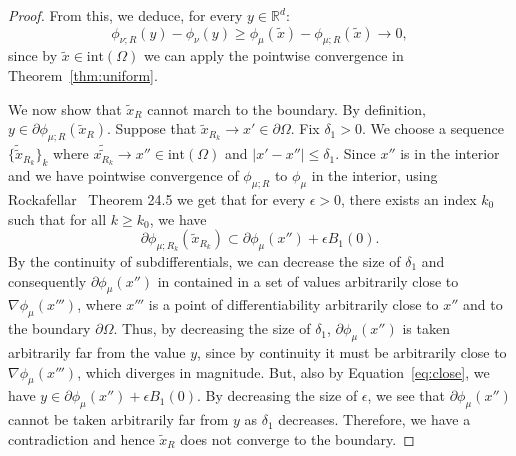 \documentclass{amsart}
\theoremstyle{lemma}
\theoremstyle{remark}
\begin{document}
\begin{proof}
From this, we deduce, for every $y \in \mathbb{R}^d$:
\begin{equation}\label{eq:xtilde}
\phi_{\nu;R}(y) - \phi_{\nu}(y) \geq \phi_{\mu}(\tilde{x}) - \phi_{\mu;R}(\tilde{x}) \rightarrow 0,
\end{equation}
since by $\tilde{x} \in \text{int}(\Omega)$ we can apply the pointwise convergence in Theorem~\ref{thm:uniform}.


We now show that $\tilde{x}_{R}$ cannot march to the boundary. By definition, $y \in \partial \phi_{\mu;R}(\tilde{x}_{R})$. Suppose that $\tilde{x}_{R_{k}} \rightarrow x' \in \partial \Omega$. Fix $\delta_1>0$. We choose a sequence $\{ \tilde{\tilde{x}}_{R_{k}} \}_{k}$ where $\tilde{\tilde{x_{R_{k}}}} \rightarrow x'' \in \text{int}(\Omega)$ and $\vert x' - x'' \vert \leq \delta_1$. Since $x''$ is in the interior and we have pointwise convergence of $\phi_{\mu;R}$ to $\phi_{\mu}$ in the interior, using Rockafellar~\cite{rockafellar} Theorem 24.5 we get that for every $\epsilon>0$, there exists an index $k_0$ such that for all $k \geq k_0$, we have
\begin{equation}\label{eq:close}
\partial \phi_{\mu;R_{k}}(\tilde{x}_{R_{k}}) \subset \partial \phi_{\mu} (x'') + \epsilon B_{1}(0).
\end{equation}
By the continuity of subdifferentials, we can decrease the size of $\delta_1$ and consequently $\partial \phi_{\mu}(x'')$ in contained in a set of values arbitrarily close to $\nabla \phi_{\mu}(x''')$, where $x'''$ is a point of differentiability arbitrarily close to $x''$ and to the boundary $\partial \Omega$. Thus, by decreasing the size of $\delta_1$, $\partial \phi_{\mu}(x'')$ is taken arbitrarily far from the value $y$, since by continuity it must be arbitrarily close to $\nabla \phi_{\mu}(x''')$, which diverges in magnitude. But, also by Equation~\eqref{eq:close}, we have $y \in \partial \phi_{\mu} (x'') + \epsilon B_{1}(0)$. By decreasing the size of $\epsilon$, we see that $\partial \phi_{\mu}(x'')$ cannot be taken arbitrarily far from $y$ as $\delta_1$ decreases. Therefore, we have a contradiction and hence $\tilde{x}_{R}$ does not converge to the boundary.


\end{proof}
\end{document}
